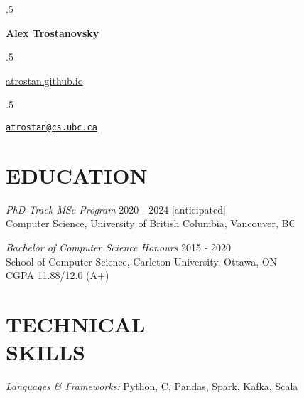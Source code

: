 \documentclass[margin]{res}
\newcommand{\CC}{C\nolinebreak\hspace{-.05em}\raisebox{.4ex}{\tiny\bf +}\nolinebreak\hspace{-.10em}\raisebox{.4ex}{\tiny\bf +}}
\begin{document}
\moveleft.5\hoffset\centerline{\large\bf Alex Trostanovsky}
\moveleft.5\hoffset\centerline{
      {\href{https://atrostan.github.io/}{\textsf{atrostan.github.io}}}      
      \textbullet{}
      \textbullet{}}

\moveleft.5\hoffset\centerline{
{ \tt \href{mailto:atrostan@cs.ubc.ca}{atrostan@cs.ubc.ca}}}
\begin{resume}


\section{EDUCATION} 

{\sl PhD-Track MSc Program}  \hfill 2020 - 2024 [anticipated]\\
Computer Science, University of British Columbia, Vancouver, BC

{\sl Bachelor of Computer Science Honours}  \hfill 2015 - 2020\\
School of Computer Science, Carleton University, Ottawa, ON \\
CGPA 11.88/12.0 (A+)\\

\section{TECHNICAL \\ SKILLS} {\sl Languages \& Frameworks:} Python, \CC, Pandas, Spark, Kafka, Scala


\end{resume}
\end{document}

